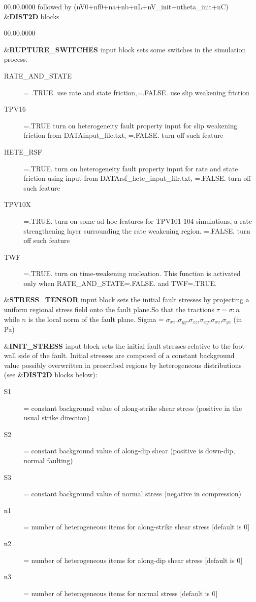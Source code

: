 \begin{lyxlist}{00.00.0000}
followed by (nV0+nf0+na+nb+nL+nV\_init+ntheta\_init+nC) \&\textbf{DIST2D} blocks\\


\begin{lyxlist}{00.00.0000}
\item [{\&\textbf{RUPTURE\_SWITCHES}}] input block sets some switches in the simulation process.
  \begin{description}
    \item [{RATE\_AND\_STATE}]
         = .TRUE. use rate and state friction,=.FALSE. use slip weakening friction
    \item [{TPV16}]
         =.TRUE turn on heterogeneity fault property input for slip weakening friction from DATA\/input\_file.txt,
         =.FALSE. turn off such feature
    \item [{HETE\_RSF}]
         =.TRUE. turn on heterogeneity fault property input for rate and state friction
              using input from DATA\/rsf\_hete\_input\_filr.txt,
   =.FALSE. turn off such feature
    \item[{TPV10X}]
         =.TRUE. turn on some ad hoc features for TPV101-104 simulations, a rate strengthening
   layer surrounding the rate weakening region.
   =.FALSE. turn off such feature
    \item[{TWF}]
         =.TRUE. turn on time-weakening nucleation. This function is activated only when
         RATE\_AND\_STATE=.FALSE. and TWF=.TRUE.
   \end{description}

\item [{\&\textbf{STRESS\_TENSOR}}] input block sets the initial fault stresses
  by projecting a uniform regional stress field onto the fault plane.So that the
  tractions $\tau = \sigma : n$ while $n$ is the local norm of the fault plane.
  Sigma =  $\sigma_{xx}$,$\sigma_{yy}$,$\sigma_{zz}$,$\sigma_{xy}$,$\sigma_{xz}$,$\sigma_{yz}$
  (in Pa)

\item [{\&\textbf{INIT\_STRESS}}] input block sets the initial fault stresses
relative to the foot-wall side of the fault. Initial stresses are
composed of a constant background value possibly overwritten in prescribed
regions by heterogeneous distributions (see \&\textbf{DIST2D} blocks
below):
\begin{description}
\item [{S1}] = constant background value of along-strike shear stress (positive
in the usual strike direction)
\item [{S2}] = constant background value of along-dip shear (positive is
down-dip, normal faulting)
\item [{S3}] = constant background value of normal stress (negative in
compression)
\item [{n1}] = number of heterogeneous items for along-strike shear stress
{[}default is 0{]}
\item [{n2}] = number of heterogeneous items for along-dip shear stress
{[}default is 0{]}
\item [{n3}] = number of heterogeneous items for normal stress {[}default
is 0{]}
\end{description}


\end{lyxlist}
\end{lyxlist}
